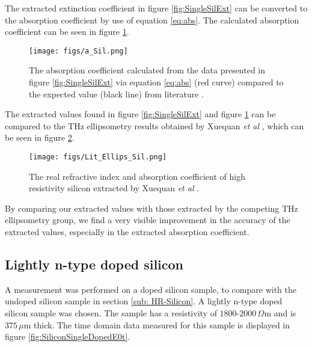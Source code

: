 The extracted extinction coefficient in figure \ref{fig:SingleSilExt} can be converted to the absorption coefficient by use of equation \ref{eq:abs}. The calculated absorption coefficient can be seen in figure \ref{fig:SiliconAb}.

\begin{figure}[H]
\begin{center}
\texttt{[image: figs/a\_Sil.png]}
\end{center}
\caption[Extract absorption coefficient of single layer undoped silicon sample]{\label{fig:SiliconAb} The absorption coefficient calculated from the data presented in figure \ref{fig:SingleSilExt} via equation \ref{eq:abs} (red curve) compared to the expected value (black line) from literature \cite{Li-2008,Jepsen-2007,Grischkowsky1990}.}
\end{figure}

The extracted values found in figure \ref{fig:SingleSilExt} and figure \ref{fig:SiliconAb} can be compared to the THz ellipsometry results obtained by Xuequan \textit{et al} \cite{Xuequan2018}, which can be seen in figure \ref{fig:SiliconExLit}.

\begin{figure}[H]
\begin{center}
\texttt{[image: figs/Lit\_Ellips\_Sil.png]}
\end{center}
\caption[Literature values of single layer undoped silicon sample]{\label{fig:SiliconExLit} The real refractive index and absorption coefficient of high resistivity silicon extracted by Xuequan \textit{et al} \cite{Xuequan2018}.}
\end{figure}

By comparing our extracted values with those extracted by the competing THz ellipsometry group, we find a very visible improvement in the accuracy of the extracted values, especially in the extracted absorption coefficient.

\subsection{Lightly n-type doped silicon}
\label{sub: n-Silicon}

A measurement was performed on a doped silicon sample, to compare with the undoped silicon sample in section \ref{sub: HR-Silicon}. A lightly n-type doped silicon sample was chosen. The sample has a resistivity of $1800$-$2000\,\Omega$m and is $375\,\mu$m thick. The time domain data measured for this sample is displayed in figure \ref{fig:SiliconSingleDopedE0t}.

